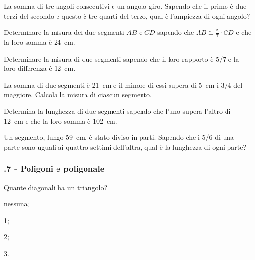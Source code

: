 \begin{multicols}{2}
\begin{esercizio}
\label{ese:1.119}
La somma di tre angoli consecutivi è un angolo giro. Sapendo che il primo è due terzi del secondo e questo è tre quarti del terzo, qual è l'ampiezza di ogni angolo?
\end{esercizio}

\begin{esercizio}
\label{ese:1.120}
Determinare la misura dei due segmenti $AB$ e $CD$ sapendo che $AB\cong \frac{5}{7}\cdot CD$ e che la loro somma è 24~cm.
\end{esercizio}

\begin{esercizio}
\label{ese:1.121}
Determinare la misura di due segmenti sapendo che il loro rapporto è $5/7$ e la loro differenza è 12~cm.
\end{esercizio}

\begin{esercizio}
\label{ese:1.122}
La somma di due segmenti è 21~cm e il minore di essi supera di 5~cm i $3/4$ del maggiore. Calcola la misura di ciascun segmento.
\end{esercizio}

\begin{esercizio}
\label{ese:1.123}
Determina la lunghezza di due segmenti sapendo che l'uno supera l'altro di 12~cm e che la loro somma è 102~cm.
\end{esercizio}

\begin{esercizio}
\label{ese:1.124}
Un segmento, lungo 59~cm, è stato diviso in parti. Sapendo che i $5/6$ di una parte sono uguali ai quattro settimi dell'altra, qual è la lunghezza di ogni parte?
\end{esercizio}

\end{multicols}

\subsubsection*{\thechapter.7 - Poligoni e poligonale}

\begin{esercizio}
\label{ese:1.125}
Quante diagonali ha un triangolo?
\begin{multicols}{4}
\begin{enumeratea}
\item nessuna;
\item 1;
\item 2;
\item 3.
\end{enumeratea}
\end{multicols}
\end{esercizio}

